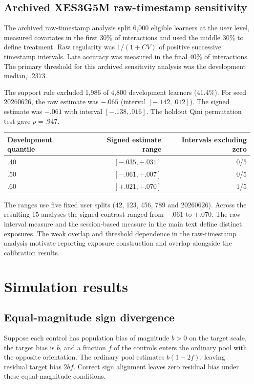 \subsection{Archived XES3G5M raw-timestamp sensitivity}

The archived raw-timestamp analysis split 6,000 eligible learners at the user level, measured covariates in the first 30\% of interactions and used the middle 30\% to define treatment. Raw regularity was $1/(1+CV)$ of positive successive timestamp intervals. Late accuracy was measured in the final 40\% of interactions. The primary threshold for this archived sensitivity analysis was the development median, .2373.

The support rule excluded 1,986 of 4,800 development learners (41.4\%). For seed 20260626, the raw estimate was $-.065$ (interval $[-.142,.012]$). The signed estimate was $-.061$ with interval $[-.138,.016]$. The holdout Qini permutation test gave $p=.947$.

\begin{center}\small
\begin{tabular}{lrr}
\toprule
Development quantile & Signed estimate range & Intervals excluding zero\\
\midrule
.40 & $[-.035,+.031]$ & 0/5\\
.50 & $[-.061,+.007]$ & 0/5\\
.60 & $[+.021,+.070]$ & 1/5\\
\bottomrule
\end{tabular}
\end{center}

The ranges use five fixed user splits (42, 123, 456, 789 and 20260626). Across the resulting 15 analyses the signed contrast ranged from $-.061$ to $+.070$. The raw interval measure and the session-based measure in the main text define distinct exposures. The weak overlap and threshold dependence in the raw-timestamp analysis motivate reporting exposure construction and overlap alongside the calibration results.


\section{Simulation results}
\subsection{Equal-magnitude sign divergence}

Suppose each control has population bias of magnitude $b>0$ on the target scale, the target bias is $b$, and a fraction $f$ of the controls enters the ordinary pool with the opposite orientation. The ordinary pool estimates $b(1-2f)$, leaving residual target bias $2bf$. Correct sign alignment leaves zero residual bias under these equal-magnitude conditions.

